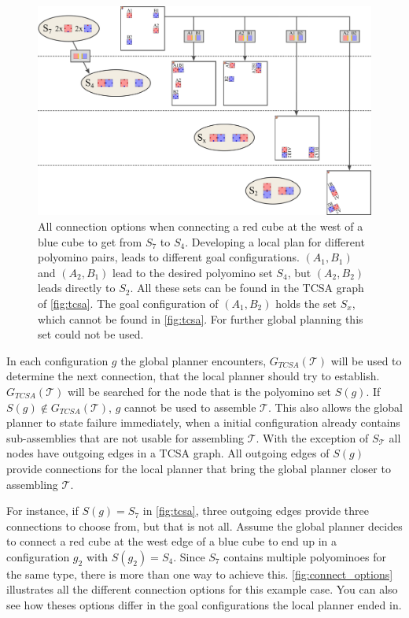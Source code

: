 \begin{figure}
	\centering
	\includegraphics[width=1\textwidth]{figures/connect_options.pdf}
	\caption[Example of connection options for one two-cut-sub-assembly edge]{All connection options when connecting a red cube at the west of a blue cube to get from $S_7$ to $S_4$. Developing a local plan for different polyomino pairs, leads to different goal configurations. $(A_1,B_1)$ and $(A_2,B_1)$ lead to the desired polyomino set $S_4$, but $(A_2,B_2)$ leads directly to $S_2$. All these sets can be found in the TCSA graph of \autoref{fig:tcsa}. The goal configuration of $(A_1, B_2)$ holds the set $S_x$, which cannot be found in \autoref{fig:tcsa}. For further global planning this set could not be used.}
	\label{fig:connect_options}
\end{figure}

In each configuration $g$ the global planner encounters, $G_{\textit{TCSA}}(\mathcal{T})$ will be used to determine the next connection, that the local planner should try to establish.
$G_{\textit{TCSA}}(\mathcal{T})$ will be searched for the node that is the polyomino set $S(g)$.
If $S(g) \notin G_{\textit{TCSA}}(\mathcal{T})$, $g$ cannot be used to assemble $\mathcal{T}$.
This also allows the global planner to state failure immediately, when a initial configuration already contains sub-assemblies that are not usable for assembling $\mathcal{T}$.
With the exception of $S_\mathcal{T}$ all nodes have outgoing edges in a TCSA graph.
All outgoing edges of $S(g)$ provide connections for the local planner that bring the global planner closer to assembling $\mathcal{T}$.

For instance, if $S(g) = S_7$ in \autoref{fig:tcsa}, three outgoing edges provide three connections to choose from, but that is not all.
Assume the global planner decides to connect a red cube at the west edge of a blue cube to end up in a configuration $g_2$ with $S(g_2) = S_4$.
Since $S_7$ contains multiple polyominoes for the same type, there is more than one way to achieve this.
\autoref{fig:connect_options} illustrates all the different connection options for this example case.
You can also see how theses options differ in the goal configurations the local planner ended in.

